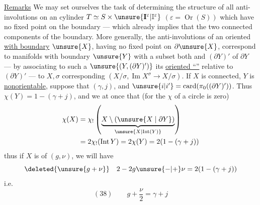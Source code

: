 \uline{Remarks} We may set ourselves the task of determining the structure of all anti-involutions \inserted{$\tau$} on an  cylinder $T\simeq S\times\unsure{\mathbf I^{\varepsilon}|\mathbb I^{\varepsilon}}$ $(\varepsilon=\operatorname{Or}(S))$ which  have no fixed point on the boundary --- which already implies that \inserted{$\tau$}  the two connected components of the boundary. More generally, the anti-involutions \inserted{$\tau$} of an oriented  \uline{with boundary} $\unsure{X}$, having no fixed point on $\partial\unsure{X}$, correspond to manifolds with boundary $\unsure{Y}$  with a subset both  and  $(\partial Y)'$ of $\partial Y$ --- by associating to such a $\unsure{(Y,(\partial Y)')}$ its \uline{oriented ``''} relative to $(\partial Y)'$ --- to $X,\sigma$ corresponding $(X/\sigma,\operatorname{Im}X^\sigma\longrightarrow X/\sigma)$. If $X$ is connected,  $Y$ is  \uline{nonorientable}, suppose that  $(\gamma,j)$,  and    $\unsure{i|i'}=\operatorname{card}(\pi_0((\partial Y)'))$. Thus $\chi(Y)=1-(\gamma+j)$, and we  at once that  (for the $\chi$ of a circle is zero)
\[
\begin{split}
\chi(X)&=\chi_!\left(\underbrace{X\setminus(\unsure{X\mid\partial Y})}_{\unsure{X\mid\operatorname{Int}(Y)}}\right)\\
&=2\chi_!(\operatorname{Int}Y)=2\chi(Y)=2(1-(\gamma+j))
\end{split}
\]
thus if $X$ is of  $(g,\nu)$, we will have 
\[
\deleted{\unsure{g+\nu}}\quad 2-2g\unsure{-|+}\nu=2(1-(\gamma+j))
\]
i.e.
\[
(38)\qquad g+\frac{\nu}{2}=\gamma+j
\]




